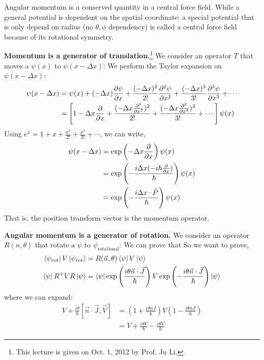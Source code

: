 \documentclass{school-22.101-notes}
\date{October 12, 2011}
\begin{document}
\maketitle

Angular momentum is a conserved quantity in a central force field. While a general potential is dependent on the spatial coordinate:
a special potential that is only depend on radius (no $\theta, \phi$ dependency) is called a central force field because of its rotational symmetry. 

\textbf{Momentum is a generator of translation.}\footnote{This lecture is given on Oct. 1, 2012 by Prof. Ju Li.} We consider an operator $T$ that moves a $\psi(x)$ to $\psi(x-\Delta x)$: 
We perform the Taylor expansion on $\psi(x - \Delta x)$: 
\begin{align}
  \psi(x - \Delta x) &= \psi(x) + (-\Delta x) \frac{\partial \psi}{\partial x} + \frac{(-\Delta x)^2}{2!} \frac{\partial^{2} \psi}{\partial x ^{2}} + \frac{(-\Delta x)^3}{3!} \frac{\partial^{3} \psi}{\partial x ^{3}} + \cdots \\
  &= \left[ 1 - \Delta x \frac{\partial}{\partial x} + \frac{(-\Delta x \frac{\partial^{2} }{\partial x ^{2}})^2}{2!} + \frac{(-\Delta x \frac{\partial^{3} }{\partial x ^{3}})^3}{3!} + \cdots \right] \psi(x) 
\end{align}
Using $e^x = 1 + x + \frac{x^2}{2!} + \frac{x^3}{3!} + \cdots$, we can write, 
\begin{align}
  \psi(x - \Delta x) &= \exp \left( -\Delta x \frac{\partial}{\partial x} \right) \psi(x) \\
  &= \exp \left(- \frac{i \Delta x (-i \hbar \frac{\partial}{\partial x})}{\hbar} \right) \psi(x) \\
  &= \exp \left(-\frac{i \Delta x \cdot \hat{P} }{\hbar} \right) \psi(x)
\end{align}
That is, the position transform vector is the momentum operator. 


\textbf{Angular momentum is a generator of rotation.} We consider an operator $R(n, \theta)$ that rotate a $\psi$ to $\psi_{\mathrm{rotational}}$: 
We can prove that 
So we want to prove, 
\begin{align}
\left< \psi_{\mathrm{rot}} \right| V \left| \psi_{\mathrm{rot}} \right> &= R(\vec{n}, \theta) \left< \psi \right| V \left| \psi \right> \\
\left< \psi \right| R^+ V R \left| \psi \right> &= \left< \psi \right| \exp \left( \frac{i \theta \vec{n} \cdot \vec{J} }{\hbar} \right) V \exp \left( - \frac{i \theta \vec{n} \cdot \vec{J} }{\hbar} \right) \left| \psi \right> 
\end{align}
where we can expand: 
\begin{align}
V + \frac{i \theta}{\hbar} [ \vec{n} \cdot \vec{J}, \vec{V} ] &= \left( 1 + \frac{i \theta n J}{\hbar} \right) V \left(  1 - \frac{i \theta n J}{\hbar} \right) \\
&= V + \frac{i \theta V}{\hbar} - \frac{i \theta V}{\hbar}  
\end{align}
\end{document}
